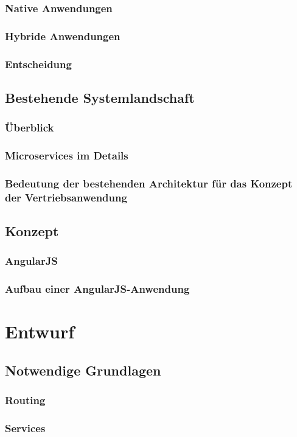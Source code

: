 \subsection{Native Anwendungen}
\subsection{Hybride Anwendungen}
\subsection{Entscheidung}
\section{Bestehende Systemlandschaft}
\subsection{Überblick}
\subsection{Microservices im Details}
\subsection{Bedeutung der bestehenden Architektur für das Konzept der Vertriebsanwendung}
\section{Konzept}
\subsection{AngularJS}
\subsection{Aufbau einer AngularJS-Anwendung}

\chapter{Entwurf}
\section{Notwendige Grundlagen}
\subsection{Routing}
\subsection{Services}
